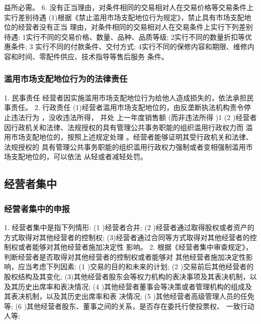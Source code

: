 \documentclass[UTF8,12pt]{ctexart}
\numberwithin{equation}{section} %
\numberwithin{figure}{section}
\numberwithin{table}{section}
\begin{document}
	益所必需。
	6. 没有正当理由，对条件相同的交易相对人在交易价格等交易条件上实行差别待遇
	(1)根据《禁止滥用市场支配地位行为规定》，禁止具有市场支配地位的经营者没有正当
	理由，对条件相同的交易相对人在交易条件上实行下列差别待遇:
	1实行不同的交易价格、数量、品种、品质等级;
	2实行不同的数量折扣等优惠条件;
	3 实行不同的付款条件、交付方式;
	4实行不同的保修内容和期限、维修内容和时间、零配件供应、技术指导等售后服务
	条件。
	
	\subsubsection{滥用市场支配地位行为的法律责任}
	
	1. 民事责任 经营者因实施滥用市场支配地位行为给他人造成损失的，依法承担民事责任。
	2. 行政责任
	(1)经营者滥用市场支配地位的，由反垄断执法机构责令停止违法行为 ，没收违法所得， 并处 上一年度销售额 (而非违法所得 )1%
	(2 )经营者因行政机关和法律、法规授权的具有管理公共事务职能的组织滥用行政权力而 滥用市场支配地位的，按照上述规定处理 。经营者能够证明其受行政机关和法律、法规授权的 具有管理公共事务职能的组织滥用行政权力强制或者变相强制滥用市场支配地位的，可以依法 从轻或者减轻处罚。
	
	\subsection{经营者集中}
	
	\subsubsection{经营者集中的申报}
	1. 经营者集中是指下列情形:
	(1 )经营者合并;
	(2 )经营者通过取得股权或者资产的方式取得对其他经营者的控制权; (3)经营者通过合同等方式取得对其他经营者的控制权或者能够对其他经营者施加决定性
	影响。
	2. 根据《经营者集中审查规定》，判断经营者是否取得对其他经营者的控制权或者能够对 其他经营者施加决定性影响，应当考虑下列因素:
	(1 )交易的目的和未来的计划;
	(2 )交易前后其他经营者的股权结构及其变化; (3)其他经营者股东会等权力机构的表决事项及其表决机制，以及其历史出席率和表决情况; (4 )其他经营者董事会等决策或者管理机构的组成及其表决机制，以及其历史出席率和表 决情况;
	(5 )其他经营者高级管理人员的任免等;
	(6 )其他经营者股东、董事之间的关系，是否存在委托行使投票权、 一致行动人等;
	
\end{document}
